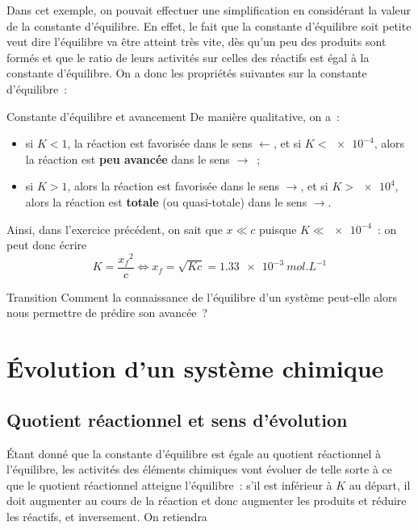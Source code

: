 \documentclass[../main/main.tex]{subfiles}
\begin{document}
Dans cet exemple, on pouvait effectuer une simplification en considérant la
valeur de la constante d'équilibre. En effet, le fait que la constante
d'équilibre soit petite veut dire l'équilibre va être atteint très vite, dès
qu'un peu des produits sont formés et que le ratio de leurs activités sur celles
des réactifs est égal à la constante d'équilibre. On a donc les propriétés
suivantes sur la constante d'équilibre~:

\begin{prop}[label=prop:K]{Constante d'équilibre et avancement} De manière
    qualitative, on a~:
    \begin{itemize}
        \item si $K < 1$, la réaction est favorisée dans le sens $\leftarrow$,
            et si $K < \num{e-4}$, alors la réaction est \textbf{peu avancée}
            dans le sens $\rightarrow$~;
        \item si $K > 1$, alors la réaction est favorisée dans le sens
            $\rightarrow$, et si $K > \num{e4}$, alors la réaction est
            \textbf{totale} (ou quasi-totale) dans le sens $\rightarrow$.
    \end{itemize}
\end{prop}

Ainsi, dans l'exercice précédent, on sait que $x \ll c$ puisque $K \ll
\num{e-4}$~: on peut donc écrire
\[ K = \frac{x_f{}^2}{c} \Leftrightarrow x_f = \sqrt{Kc} =
\SI{1.33e-3}{mol.L^{-1}}\]

\begin{instruc}[trans]{Transition}
    Comment la connaissance de l'équilibre d'un système peut-elle alors nous
    permettre de prédire son avancée~?
\end{instruc}

\section{Évolution d'un système chimique}
\subsection{Quotient réactionnel et sens d'évolution}

Étant donné que la constante d'équilibre est égale au quotient réactionnel à
l'équilibre, les activités des éléments chimiques vont évoluer de telle sorte à
ce que le quotient réactionnel atteigne l'équilibre~: s'il est inférieur à $K$
au départ, il doit augmenter au cours de la réaction et donc augmenter les
produits et réduire les réactifs, et inversement. On
retiendra
\end{document}
